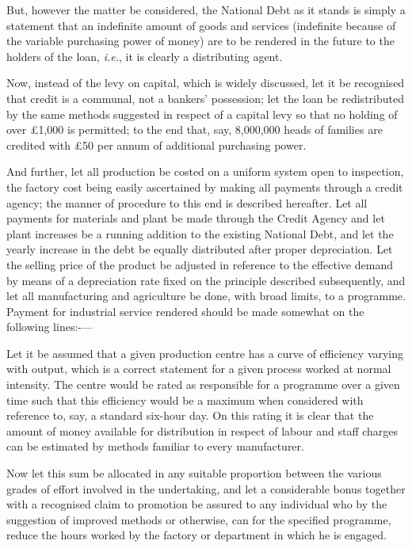 \documentclass{book}
\begin{document}
But, however the matter be considered, the National Debt as it stands is simply a statement that an indefinite amount of goods and services (indefinite because of the variable purchasing power of money) are to be rendered in the future to the holders of the loan, \emph{i.e.}, it is clearly a distributing agent.

Now, instead of the levy on capital, which is widely discussed, let it be recognised that credit is a communal, not a bankers’ possession; let the loan be redistributed by the same methods suggested in respect of a capital levy so that no holding of over £1,000 is permitted; to the end that, say, 8,000,000 heads of families are credited with £50 per annum of additional purchasing power.

And further, let all production be costed on a uniform system open to inspection, the factory cost being easily ascertained by making all payments through a credit agency; the manner of procedure to this end is described hereafter. Let all payments for materials and plant be made through the Credit Agency and let plant increases be a running addition to the existing National Debt, and let the yearly increase in the debt be equally distributed after proper depreciation. Let the selling price of the product be adjusted in reference to the effective demand by means of a depreciation rate fixed on the principle described subsequently, and let all manufacturing and agriculture be done, with broad limits, to a programme. Payment for industrial service rendered should be made somewhat on the following lines:-—

Let it be assumed that a given production centre has a curve of efficiency varying with output, which is a correct statement for a given process worked at normal intensity. The centre would be rated as responsible for a programme over a given time such that this efficiency would be a maximum when considered with reference to, say, a standard six-hour day. On this rating it is clear that the amount of money available for distribution in respect of labour and staff charges can be estimated by methods familiar to every manufacturer.

Now let this sum be allocated in any suitable proportion between the various grades of effort involved in the undertaking, and let a considerable bonus together with a recognised claim to promotion be assured to any individual who by the suggestion of improved methods or otherwise, can for the specified programme, reduce the hours worked by the factory or department in which he is engaged.
\end{document}
